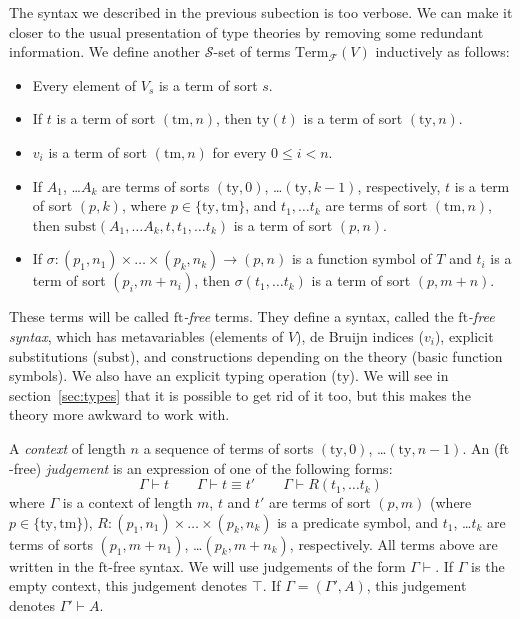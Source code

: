 \documentclass[reqno]{amsart}
\theoremstyle{definition}
\theoremstyle{remark}
\newcommand{\fs}[1]{\mathrm{#1}}
\newcommand{\Term}{\fs{Term}}
\newcommand{\subst}{\fs{subst}}
\newcommand{\ft}{\fs{ft}}
\newcommand{\ty}{\fs{ty}}
\newcommand{\tm}{\fs{tm}}
\numberwithin{figure}{section}
\begin{document}
The syntax we described in the previous subection is too verbose.
We can make it closer to the usual presentation of type theories by removing some redundant information.
We define another $\mathcal{S}$-set of terms $\Term_\mathcal{F}(V)$ inductively as follows:
\begin{itemize}
\item Every element of $V_s$ is a term of sort $s$.
\item If $t$ is a term of sort $(\tm,n)$, then $\ty(t)$ is a term of sort $(\ty,n)$.
\item $v_i$ is a term of sort $(\tm,n)$ for every $0 \leq i < n$.
\item If $A_1$, \ldots $A_k$ are terms of sorts $(\ty,0)$, \ldots $(\ty,k-1)$, respectively, $t$ is a term of sort $(p,k)$, where $p \in \{ \ty, \tm \}$, and $t_1, \ldots t_k$ are terms of sort $(\tm,n)$, then $\subst(A_1, \ldots A_k, t, t_1, \ldots t_k)$ is a term of sort $(p,n)$.
\item If $\sigma : (p_1,n_1) \times \ldots \times (p_k,n_k) \to (p,n)$ is a function symbol of $T$ and $t_i$ is a term of sort $(p_i,m+n_i)$, then $\sigma(t_1, \ldots t_k)$ is a term of sort $(p,m+n)$.
\end{itemize}
These terms will be called \emph{$\ft$-free} terms.
They define a syntax, called the \emph{$\ft$-free syntax}, which has metavariables (elements of $V$), de Bruijn indices ($v_i$), explicit substitutions ($\subst$), and constructions depending on the theory (basic function symbols).
We also have an explicit typing operation ($\ty$).
We will see in section~\ref{sec:types} that it is possible to get rid of it too, but this makes the theory more awkward to work with.

A \emph{context} of length $n$ a sequence of terms of sorts $(\ty,0)$, \ldots $(\ty,n-1)$.
An ($\ft$-free) \emph{judgement} is an expression of one of the following forms:
\[ \Gamma \vdash t \qquad \Gamma \vdash t \equiv t' \qquad \Gamma \vdash R(t_1, \ldots t_k) \]
where $\Gamma$ is a context of length $m$, $t$ and $t'$ are terms of sort $(p,m)$ (where $p \in \{ \ty, \tm \}$), $R : (p_1,n_1) \times \ldots \times (p_k,n_k)$ is a predicate symbol, and $t_1$, \ldots $t_k$ are terms of sorts $(p_1,m+n_1)$, \ldots $(p_k,m+n_k)$, respectively.
All terms above are written in the $\ft$-free syntax.
We will use judgements of the form $\Gamma \vdash$.
If $\Gamma$ is the empty context, this judgement denotes $\top$.
If $\Gamma = (\Gamma', A)$, this judgement denotes $\Gamma' \vdash A$.
\end{document}
